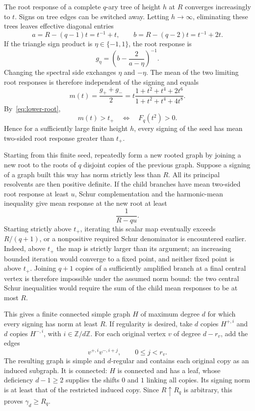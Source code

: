 \documentclass[11pt]{article}
\numberwithin{equation}{section}
\begin{document}
The root response of a complete $q$-ary tree of height $h$ at $R$
converges increasingly to $t$. Signs on tree edges can be switched
away. Letting $h\to\infty$, eliminating these trees leaves effective
diagonal entries
\[
 a=R-(q-1)t=t^{-1}+t,
 \qquad b=R-(q-2)t=t^{-1}+2t.
\]
If the triangle sign product is $\eta\in\{-1,1\}$, the root
response is
\[
 g_\eta=\left(b-\frac2{a-\eta}\right)^{-1}.
\]
Changing the spectral side exchanges $\eta$ and $-\eta$. The mean
of the two limiting root responses is therefore independent of the
signing and equals
\begin{equation}\label{eq:triangle-mean}
 m(t)=\frac{g_++g_-}{2}
 =t\frac{1+t^2+t^4+2t^6}{1+t^2+t^4+4t^8}.
\end{equation}
By~\eqref{eq:lower-root},
\[
 m(t)>t_+\quad\Longleftrightarrow\quad F_q(t^2)>0.
\]
Hence for a sufficiently large finite height $h$, every signing of
the seed has mean two-sided root response greater than $t_+$.

Starting from this finite seed, repeatedly form a new rooted graph
by joining a new root to the roots of $q$ disjoint copies of the
previous graph. Suppose a signing of a graph built this way has norm
strictly less than $R$. All its principal resolvents are then
positive definite. If the child branches have mean two-sided root
response at least $u$, Schur complementation and the harmonic-mean
inequality give mean response at the new root at least
\[
 \frac1{R-qu}.
\]
Starting strictly above $t_+$, iterating this scalar map eventually
exceeds $R/(q+1)$, or a nonpositive required Schur denominator is
encountered earlier. Indeed, above $t_+$ the map is strictly larger
than its argument; an increasing bounded iteration would converge
to a fixed point, and neither fixed point is above $t_+$.
Joining $q+1$ copies of a sufficiently amplified branch at a final
central vertex is therefore impossible under the assumed norm bound:
the two central Schur inequalities would require the sum of the
child mean responses to be at most $R$.

This gives a finite connected simple graph $H$ of maximum degree
$d$ for which every signing has norm at least $R$. If regularity is
desired, take $d$ copies $H^{+,i}$ and $d$ copies $H^{-,i}$, with
$i\in\mathbb Z/d\mathbb Z$. For each original vertex $v$ of degree
$d-r_v$, add the edges
\[
 v^{+,i}v^{-,i+j},\qquad 0\le j<r_v.
\]
The resulting graph is simple and $d$-regular and contains each
original copy as an induced subgraph. It is connected: $H$ is
connected and has a leaf, whose deficiency $d-1\ge2$ supplies the
shifts $0$ and $1$ linking all copies. Its signing norm is at least
that of the restricted induced copy. Since $R\uparrow R_q$ is
arbitrary, this proves $\gamma_d\ge R_q$.
\end{document}
